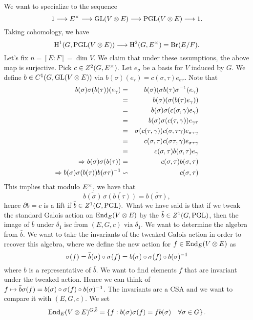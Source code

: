 We want to specialize to the sequence
$$1 \longrightarrow E^{\times} \longrightarrow \operatorname{GL}(V\otimes E) \longrightarrow \operatorname{PGL} (V \otimes E) \longrightarrow 1.$$
Taking cohomology, we have 
$$\text{H}^1(G,\operatorname{PGL}(V\otimes E)) \longrightarrow \text{H}^2(G,E^{\times}) = \operatorname{Br} (E/F).$$
Let's fix $n = [E:F] = \dim V$. We claim that under these assumptions, the above map is surjective. Pick $c \in Z^2(G,E^{\times})$. Let $e_{\sigma}$ be a basis for $V$ induced by $G$. We define $b \in C^1(G,\operatorname{GL} (V\otimes E))$ via $b(\sigma)(e_{\tau}) = c(\sigma , \tau)e_{\sigma \tau}$. Note that 
\begin{eqnarray*}
b(\sigma)\sigma (b(\tau))(e_{\gamma}) &=& b(\sigma)(\sigma b(\tau)\sigma ^{-1} (e_{\gamma}) \\
& = & b(\sigma)(\sigma (b(\tau)e_{\gamma})) \\
& = & b(\sigma ) \sigma (c(\sigma , \gamma)e_{\gamma}) \\
& = & b(\sigma ) \sigma (c(\tau , \gamma))e_{\gamma \tau} \\
& = & \sigma (c(\tau , \gamma))c(\sigma ,\tau \gamma)e_{\sigma \tau	 \gamma} \\
& = & c(\sigma ,\tau)c(\sigma \tau, \gamma)e_{\sigma \tau \gamma} \\
& = & c(\sigma ,\tau)b(\sigma , \tau)e_{\gamma} \\
\Rightarrow b(\sigma ) \sigma (b(\tau)) & = & c(\sigma , \tau)b(\sigma , \tau) \\
\Rightarrow b(\sigma) \sigma (b(\tau))b(\sigma \tau)^{-1} & \backsim & c(\sigma ,\tau)
\end{eqnarray*}
This implies that modulo $E^{\times}$, we have that 
$$\overline{b(\sigma)} \, \overline{\sigma (b(\tau))} = \overline{b(\sigma \tau)},$$
hence $\partial b = c$ is a lift if $\bar{b} \in Z^1(G,\operatorname{PGL}).$ What we have said is that if we tweak the standard Galois action on $\operatorname{End}_E(V\otimes E)$ by the $\bar{b} \in Z^1(G,\operatorname{PGL})$, then the image of $\bar{b}$ under $\delta_1$ is$c$ from $(E,G,c)$ via $\delta_1$. We want to determine the algebra from $\bar{b}$. We want to take the invariants of the tweaked Galois action in order to recover this algebra, where we define the new action for $f \in \operatorname{End}_E(V\otimes E)$ as
$$\sigma (f) = \bar{b}(\sigma)\circ \sigma (f) = b(\sigma) \circ \sigma (f) \circ b(\sigma)^{-1}$$
where $b$ is a representative of $\bar{b}$. We want to find elements $f$ that are invariant under the tweaked action. Hence we can think of $f \mapsto \bar{b}\sigma (f) = b(\sigma)\circ \sigma (f) \circ b(\sigma)^{-1}$. The invariants are a CSA and we want to compare it with $(E,G,c)$. We set
$$\operatorname{End}_E(V\otimes E)^{G,\bar{b}} = \left\lbrace f : b(\sigma)\sigma(f) = fb(\sigma) \quad \forall \sigma \in G \right\rbrace.$$
